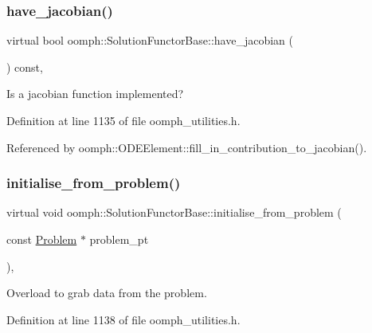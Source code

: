 \subsubsection{\texorpdfstring{have\+\_\+jacobian()}{have\_jacobian()}}
{\footnotesize\ttfamily virtual bool oomph\+::\+Solution\+Functor\+Base\+::have\+\_\+jacobian (\begin{DoxyParamCaption}{ }\end{DoxyParamCaption}) const\hspace{0.3cm}{\ttfamily [inline]}, {\ttfamily [virtual]}}



Is a jacobian function implemented? 



Definition at line 1135 of file oomph\+\_\+utilities.\+h.



Referenced by oomph\+::\+O\+D\+E\+Element\+::fill\+\_\+in\+\_\+contribution\+\_\+to\+\_\+jacobian().

\mbox{\label{classoomph_1_1SolutionFunctorBase_a016f7f144cc563df9efb7d4679b18c46}} 
\subsubsection{\texorpdfstring{initialise\+\_\+from\+\_\+problem()}{initialise\_from\_problem()}}
{\footnotesize\ttfamily virtual void oomph\+::\+Solution\+Functor\+Base\+::initialise\+\_\+from\+\_\+problem (\begin{DoxyParamCaption}\item[{const \hyperlink{classoomph_1_1Problem}{Problem} $\ast$}]{problem\+\_\+pt }\end{DoxyParamCaption})\hspace{0.3cm}{\ttfamily [inline]}, {\ttfamily [virtual]}}



Overload to grab data from the problem. 



Definition at line 1138 of file oomph\+\_\+utilities.\+h.

\mbox{\label{classoomph_1_1SolutionFunctorBase_a53482fed2379500a8f279498aed07d56}} 
